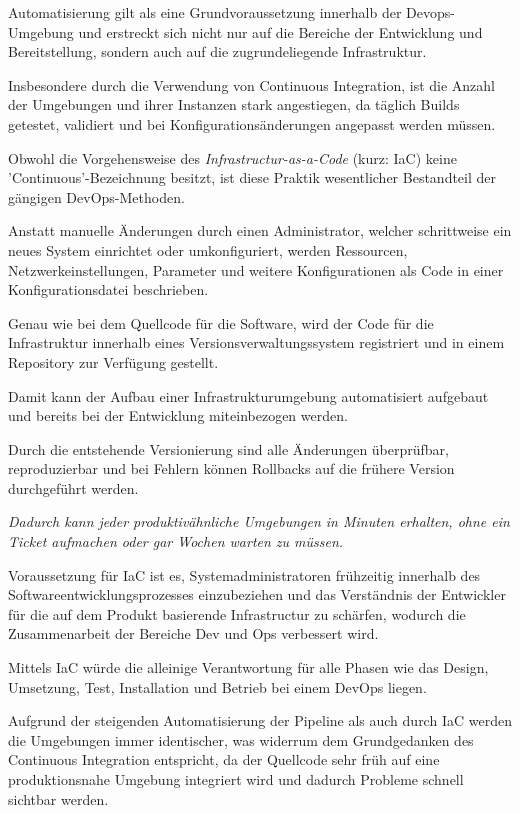 Automatisierung gilt als eine Grundvoraussetzung innerhalb der Devops-Umgebung und erstreckt sich nicht nur auf die Bereiche der Entwicklung und Bereitstellung, sondern auch auf die zugrundeliegende Infrastruktur. \cite[S. 272]{tiemeyer_handbuch_2021} 

Insbesondere durch die Verwendung von Continuous Integration, ist die Anzahl der Umgebungen und ihrer Instanzen stark angestiegen, da täglich Builds getestet, validiert und bei Konfigurationsänderungen angepasst werden müssen. \cite[S. 19]{sharma_devops_2017}

Obwohl die Vorgehensweise des \textit{Infrastructur-as-a-Code} (kurz: IaC) keine 'Continuous'-Bezeichnung besitzt, ist diese Praktik wesentlicher Bestandteil der gängigen DevOps-Methoden. \cite[S. 30]{alt_innovationsorientiertes_2017} 

Anstatt manuelle Änderungen durch einen Administrator, welcher schrittweise ein neues System einrichtet oder umkonfiguriert, werden Ressourcen, Netzwerkeinstellungen, Parameter und weitere Konfigurationen als Code in einer Konfigurationsdatei beschrieben. \cite{juner_praxisbasierte_2017} \cite{luber_was_2020}

Genau wie bei dem Quellcode für die Software, wird der Code für die Infrastruktur innerhalb eines Versionsverwaltungssystem registriert und in einem Repository zur Verfügung gestellt.

Damit kann der Aufbau einer Infrastrukturumgebung automatisiert aufgebaut und bereits bei der Entwicklung miteinbezogen werden.

Durch die entstehende Versionierung sind alle Änderungen überprüfbar, reproduzierbar und bei Fehlern können Rollbacks auf die frühere Version durchgeführt werden.\cite[S. 272]{tiemeyer_handbuch_2021}   

\textit{Dadurch kann jeder produktivähnliche Umgebungen in Minuten erhalten, ohne ein Ticket aufmachen oder gar Wochen warten zu müssen.} \cite[S. 107]{kim_devops-handbuch_2017}

Voraussetzung für IaC ist es, Systemadministratoren frühzeitig innerhalb des Softwareentwicklungsprozesses einzubeziehen und das Verständnis der Entwickler für die auf dem Produkt basierende Infrastructur zu schärfen, wodurch die Zusammenarbeit der Bereiche Dev und Ops verbessert wird. \cite[S. 30]{alt_innovationsorientiertes_2017}

Mittels IaC würde die alleinige Verantwortung für alle Phasen wie das Design, Umsetzung, Test, Installation und Betrieb bei einem DevOps liegen. \cite{kasteleiner_devops_2019}

Aufgrund der steigenden Automatisierung der Pipeline als auch durch IaC werden die Umgebungen immer identischer, was widerrum dem Grundgedanken des Continuous Integration entspricht, da der Quellcode sehr früh auf eine produktionsnahe Umgebung integriert wird und dadurch Probleme schnell sichtbar werden. \cite[S. 111 - 113]{kim_devops-handbuch_2017} 
